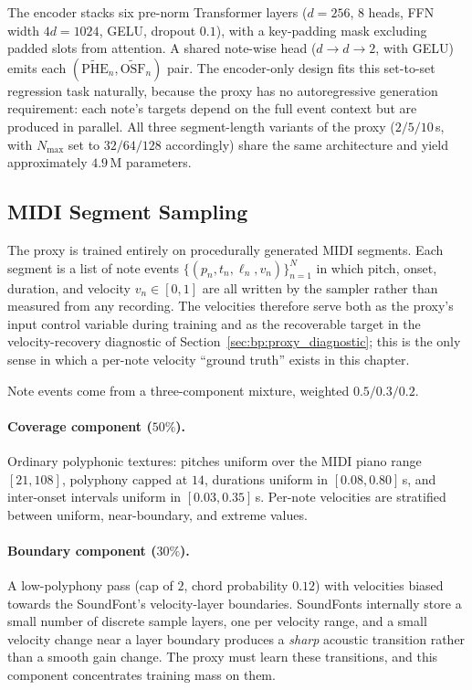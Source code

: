 The encoder stacks six pre-norm Transformer layers ($d = 256$, $8$ heads, FFN width $4d = 1024$, GELU, dropout $0.1$), with a key-padding mask excluding padded slots from attention. A shared note-wise head ($d \to d \to 2$, with GELU) emits each $(\widetilde{\mathrm{PHE}}_n, \widetilde{\mathrm{OSF}}_n)$ pair. The encoder-only design fits this set-to-set regression task naturally, because the proxy has no autoregressive generation requirement: each note's targets depend on the full event context but are produced in parallel. All three segment-length variants of the proxy ($2/5/10$\,s, with $N_{\max}$ set to $32/64/128$ accordingly) share the same architecture and yield approximately $4.9$\,M parameters.

\subsection{MIDI Segment Sampling}
\label{ssec:bp:midi_sampling}

The proxy is trained entirely on procedurally generated MIDI segments. Each segment is a list of note events $\{(p_n, t_n, \ell_n, v_n)\}_{n=1}^{N}$ in which pitch, onset, duration, and velocity $v_n \in [0,1]$ are all written by the sampler rather than measured from any recording. The velocities therefore serve both as the proxy's input control variable during training and as the recoverable target in the velocity-recovery diagnostic of Section~\ref{sec:bp:proxy_diagnostic}; this is the only sense in which a per-note velocity ``ground truth'' exists in this chapter.

Note events come from a three-component mixture, weighted $0.5 / 0.3 / 0.2$.

\paragraph{Coverage component ($50\%$).}
Ordinary polyphonic textures: pitches uniform over the MIDI piano range $[21, 108]$, polyphony capped at $14$, durations uniform in $[0.08, 0.80]$\,s, and inter-onset intervals uniform in $[0.03, 0.35]$\,s. Per-note velocities are stratified between uniform, near-boundary, and extreme values.

\paragraph{Boundary component ($30\%$).}
A low-polyphony pass (cap of $2$, chord probability $0.12$) with velocities biased towards the SoundFont's velocity-layer boundaries. SoundFonts internally store a small number of discrete sample layers, one per velocity range, and a small velocity change near a layer boundary produces a \emph{sharp} acoustic transition rather than a smooth gain change. The proxy must learn these transitions, and this component concentrates training mass on them.

